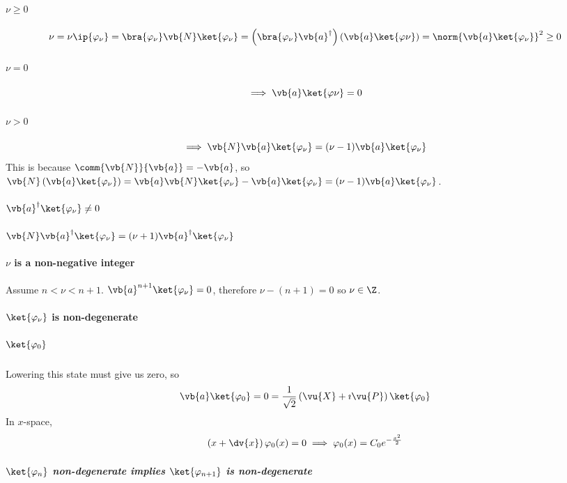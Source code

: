 \documentclass[a4paper,twoside,master.tex]{subfiles}
\begin{document}
\paragraph{$ \nu \geq 0 $}
\begin{equation}
    \nu = \nu \ip{\varphi_{\nu}} = \bra{\varphi_{\nu}} \vb{N} \ket{\varphi_{\nu}} = \left( \bra{\varphi_{\nu}} \vb{a}^\dagger \right) \left( \vb{a} \ket{\varphi \nu} \right) = \norm{\vb{a} \ket{\varphi_{\nu}}}^2 \geq 0
\end{equation}
\paragraph{$ \nu = 0 $}
\begin{equation}
    \implies \vb{a} \ket{\varphi \nu} = 0
\end{equation}
\paragraph{$ \nu > 0 $}
\begin{equation}
    \implies \vb{N}\vb{a} \ket{\varphi_{\nu}} = (\nu - 1)\vb{a} \ket{\varphi_{\nu}}
\end{equation}
This is because $ \comm{\vb{N}}{\vb{a}} = -\vb{a} $, so $ \vb{N}\left( \vb{a} \ket{\varphi_{\nu}} \right) = \vb{a}\vb{N} \ket{\varphi_{\nu}} - \vb{a} \ket{\varphi_{\nu}} = (\nu - 1)\vb{a} \ket{\varphi_{\nu}} $.
\paragraph{$ \vb{a}^\dagger \ket{\varphi_{\nu}} \neq 0 $}
\paragraph{$ \vb{N}\vb{a}^\dagger \ket{\varphi_{\nu}} = (\nu + 1)\vb{a}^\dagger \ket{\varphi_{\nu}} $}
\paragraph{$ \nu $ is a non-negative integer}
Assume $ n < \nu < n + 1 $. $ \vb{a}^{n+1} \ket{\varphi_{\nu}} = 0 $, therefore $ \nu - (n + 1) = 0 $ so $ \nu \in \Z $.
\paragraph{$ \ket{\varphi_{\nu}} $ is non-degenerate}
\subparagraph{$ \ket{\varphi_0} $}
Lowering this state must give us zero, so
\begin{equation}
    \vb{a} \ket{\varphi_0} = 0 = \frac{1}{\sqrt{2}} \left( \vu{X} + \imath\vu{P} \right) \ket{\varphi_0}
\end{equation}
In $ x $-space,
\begin{equation}
    \left( x + \dv{x} \right) \varphi_0(x) = 0 \implies \varphi_0(x) = C_0 e^{-\frac{x^2}{2}} 
\end{equation}
\subparagraph{$ \ket{\varphi_{n}} $ non-degenerate implies $ \ket{\varphi_{n+1}} $ is non-degenerate}
\end{document}
